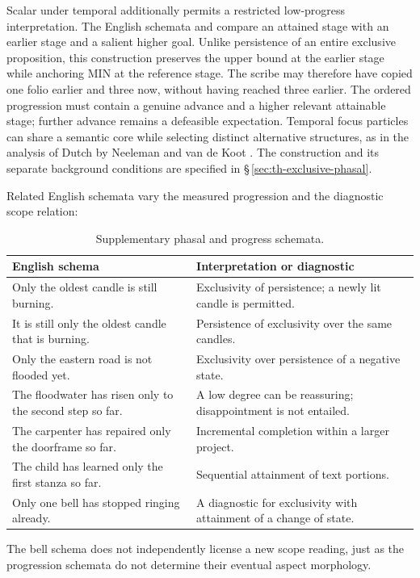 Scalar  under temporal  additionally permits a
restricted low-progress interpretation. The English schemata
 and
 compare an
attained stage with an earlier stage and a salient higher goal. Unlike
persistence of an entire exclusive proposition, this construction preserves
the upper bound at the earlier stage while anchoring MIN at the reference
stage. The scribe may therefore have copied one folio earlier and three now,
without having reached three earlier. The ordered progression must contain
a genuine advance and a higher relevant attainable stage; further advance
remains a defeasible expectation. Temporal focus particles can share a
semantic core while selecting distinct
alternative structures, as in the analysis of Dutch by Neeleman and van de Koot
\cite[§§2--3]{neelemanvandekoot2022}. The construction and its separate
background conditions are specified in §\,\ref{sec:th-exclusive-phasal}.

Related English schemata vary the measured progression and the diagnostic
scope relation:
\begin{table}[ht]
\footnotesize
\caption{Supplementary phasal and progress schemata.}
\label{tab:kamo-phasal-schemata}
\begin{tabularx}{\textwidth}{L L}
\toprule
English schema & Interpretation or diagnostic \\
\midrule
Only the oldest candle is still burning. & Exclusivity of persistence; a newly lit candle is permitted. \\
It is still only the oldest candle that is burning. & Persistence of exclusivity over the same candles. \\
Only the eastern road is not flooded yet. & Exclusivity over persistence of a negative state. \\
The floodwater has risen only to the second step so far. & A low degree can be reassuring; disappointment is not entailed. \\
The carpenter has repaired only the doorframe so far. & Incremental completion within a larger project. \\
The child has learned only the first stanza so far. & Sequential attainment of text portions. \\
Only one bell has stopped ringing already. & A diagnostic for exclusivity with attainment of a change of state. \\
\bottomrule
\end{tabularx}
\end{table}
The bell schema does not independently license a new scope reading, just as
the progression schemata do not determine their eventual aspect morphology.


